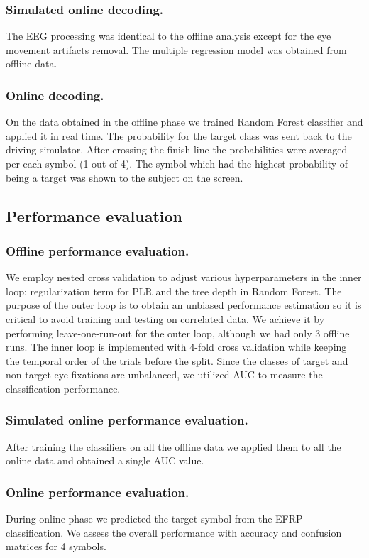 \documentclass[12pt]{iopart}
\begin{document}
\subsubsection*{Simulated online decoding.}
The EEG processing was identical to the offline analysis
except for the eye movement artifacts removal. The multiple regression
model was obtained from offline data.

\subsubsection*{Online decoding.}
On the data obtained in the offline phase we trained Random Forest classifier
and applied it in real time. The probability for the target class was sent
back to the driving simulator. After crossing the finish line
the probabilities were averaged per each symbol (1 out of 4).
The symbol which had the highest probability of being a target was
shown to the subject on the screen.


\subsection{Performance evaluation}

\subsubsection*{Offline performance evaluation.}
We employ nested cross validation to adjust various hyperparameters in the inner loop:
regularization term for PLR and the tree depth in Random Forest.
The purpose of the outer loop is to obtain an unbiased performance estimation
so it is critical to avoid training and testing on correlated data.
We achieve it by performing leave-one-run-out for the outer loop,
although we had only 3 offline runs.
The inner loop is implemented with 4-fold cross validation while keeping
the temporal order of the trials before the split.
Since the classes of target and non-target eye fixations are unbalanced,
we utilized AUC to measure the classification performance.

\subsubsection*{Simulated online performance evaluation.}
After training the classifiers on all the offline data we applied them 
to all the online data and obtained a single AUC value.

\subsubsection*{Online performance evaluation.}
During online phase we predicted the target symbol from the EFRP classification.
We assess the overall performance with accuracy and confusion matrices
for 4 symbols.
\end{document}
